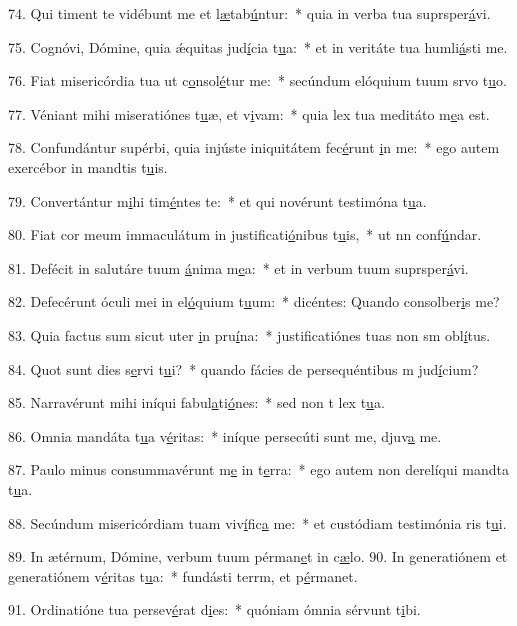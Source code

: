 74. Qui timent te vidébunt me et l\uline{æ}tab\uline{ú}ntur:~* quia in verba tua suprsper\uline{á}vi.\par 
75. Cognóvi, Dómine, quia ǽquitas jud\uline{í}cia t\uline{u}a:~* et in veritáte tua humli\uline{á}sti me.\par 
76. Fiat misericórdia tua ut c\uline{o}nsol\uline{é}tur me:~* secúndum elóquium tuum srvo t\uline{u}o.\par 
77. Véniant mihi miseratiónes t\uline{u}æ, et v\uline{i}vam:~* quia lex tua meditáto m\uline{e}a est.\par 
78. Confundántur supérbi, quia injúste iniquitátem fec\uline{é}runt \uline{i}n me:~* ego autem exercébor in mandtis t\uline{u}is.\par 
79. Convertántur m\uline{i}hi tim\uline{é}ntes te:~* et qui novérunt testimóna t\uline{u}a.\par 
80. Fiat cor meum immaculátum in justificati\uline{ó}nibus t\uline{u}is,~* ut nn conf\uline{ú}ndar.\par 
81. Defécit in salutáre tuum \uline{á}nima m\uline{e}a:~* et in verbum tuum suprsper\uline{á}vi.\par 
82. Defecérunt óculi mei in el\uline{ó}quium t\uline{u}um:~* dicéntes: Quando consolber\uline{i}s me?\par 
83. Quia factus sum sicut uter \uline{i}n pru\uline{í}na:~* justificatiónes tuas non sm obl\uline{í}tus.\par 
84. Quot sunt dies s\uline{e}rvi t\uline{u}i?~* quando fácies de persequéntibus m jud\uline{í}cium?\par 
85. Narravérunt mihi iníqui fabul\uline{a}ti\uline{ó}nes:~* sed non t lex t\uline{u}a.\par 
86. Omnia mandáta t\uline{u}a v\uline{é}ritas:~* iníque persecúti sunt me, djuv\uline{a} me.\par 
87. Paulo minus consummavérunt m\uline{e} in t\uline{e}rra:~* ego autem non derelíqui mandta t\uline{u}a.\par 
88. Secúndum misericórdiam tuam viv\uline{í}fic\uline{a} me:~* et custódiam testimónia ris t\uline{u}i.\par 
89. In ætérnum, Dómine, verbum tuum pérman\uline{e}t in c\uline{æ}lo.
90. In generatiónem et generatiónem v\uline{é}ritas t\uline{u}a:~* fundásti terrm, et p\uline{é}rmanet.\par 
91. Ordinatióne tua persev\uline{é}rat d\uline{i}es:~* quóniam ómnia sérvunt t\uline{i}bi.\par 
